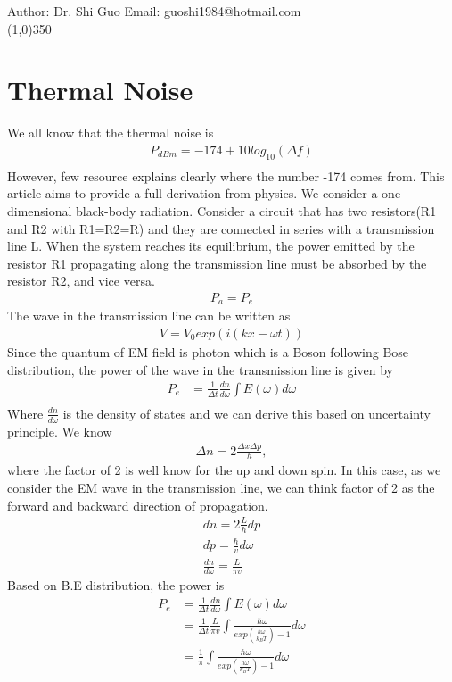 \documentclass[a4paper]{article}
\begin{document}
Author: Dr. Shi Guo  \hspace{30mm} Email: guoshi1984@hotmail.com\\
\line(1,0){350}
\section{Thermal Noise}
We all know that the thermal noise is
\begin{align*}
	P_{dBm} = -174 + 10 log_{10}(\Delta f) \\
\end{align*}
However, few resource explains clearly where the number -174 comes from. This article aims to provide a full derivation from physics. We consider a one dimensional black-body radiation. Consider a circuit that has two resistors(R1 and R2 with R1=R2=R) and they are connected in series with a transmission line L.  When the system reaches its equilibrium, the power emitted by the resistor R1 propagating along the transmission line must be absorbed by the resistor R2, and vice versa. 
\begin{align*}
	P_a = P_e
\end{align*}
The wave in the transmission line can be written as 
\begin{align*}
	V = V_0 exp(i(kx - \omega t))
\end{align*}
Since the quantum of EM field is photon which is a Boson following Bose distribution, the power of the wave in the transmission line is given by 
\begin{align*}
	P_e & = \frac{1}{\Delta t} \frac{dn}{d \omega} \int E(\omega) d \omega \\
\end{align*}
Where $\frac{dn}{d \omega}$ is the density of states and we can derive this based on uncertainty principle. We know
\begin{align*}
	\Delta n = 2\frac{\Delta x \Delta p}{h},
\end{align*}
where the factor of 2 is well know for the up and down spin. In this case, as we consider the EM wave in the transmission line, we can think factor of 2 as the forward and backward direction of propagation. 
\begin{align*}
	dn = 2\frac{L}{h}dp\\
	dp = \frac{\hbar}{v} d \omega \\
	\frac{d n}{d \omega} =\frac{L}{\pi v}
\end{align*}
Based on B.E distribution, the power is
\begin{align*}
	P_e & = \frac{1}{\Delta t} \frac{dn}{d \omega} \int E(\omega) d \omega \\
	& = \frac{1}{\Delta t} \frac{L}{ \pi v} \int \frac{\hbar \omega}{exp( \frac{\hbar \omega}{k_B T})-1} d \omega \\
	& = \frac{1}{\pi} \int \frac{\hbar \omega}{exp( \frac{\hbar \omega}{k_B T})-1} d \omega
\end{align*}
\end{document}
